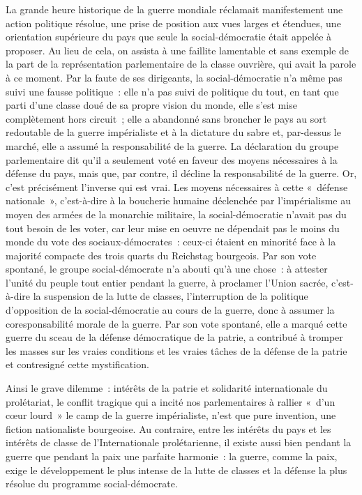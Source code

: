 \documentclass[french,twoside]{book} %
\begin{document}
La grande heure historique de la guerre mondiale réclamait manifestement une action politique résolue, une prise de position aux vues larges et étendues, une orientation supérieure du pays que seule la social-démocratie était appelée à proposer. Au lieu de cela, on assista à une faillite lamentable et sans exemple de la part de la représentation parlementaire de la classe ouvrière, qui avait la parole à ce moment. Par la faute de ses dirigeants, la social-démocratie n’a même pas suivi une fausse politique : elle n’a pas suivi de politique du tout, en tant que parti d’une classe doué de sa propre vision du monde, elle s’est mise complètement hors circuit ; elle a abandonné sans broncher le pays au sort redoutable de la guerre impérialiste et à la dictature du sabre et, par-dessus le marché, elle a assumé la responsabilité de la guerre. La déclaration du groupe parlementaire dit qu’il a seulement voté en faveur des moyens nécessaires à la défense du pays, mais que, par contre, il décline la responsabilité de la guerre. Or, c’est précisément l’inverse qui est vrai. Les moyens nécessaires à cette « défense nationale », c’est-à-dire à la boucherie humaine déclenchée par l’impérialisme au moyen des armées de la monarchie militaire, la social-démocratie n’avait pas du tout besoin de les voter, car leur mise en oeuvre ne dépendait pas le moins du monde du vote des sociaux-démocrates : ceux-ci étaient en minorité face à la majorité compacte des trois quarts du Reichstag bourgeois. Par son vote spontané, le groupe social-démocrate n’a abouti qu’à une chose : à attester l’unité du peuple tout entier pendant la guerre, à proclamer l’Union sacrée, c’est-à-dire la suspension de la lutte de classes, l’interruption de la politique d’opposition de la social-démocratie au cours de la guerre, donc à assumer la coresponsabilité morale de la guerre. Par son vote spontané, elle a marqué cette guerre du sceau de la défense démocratique de la patrie, a contribué à tromper les masses sur les vraies conditions et les vraies tâches de la défense de la patrie et contresigné cette mystification.\par
Ainsi le grave dilemme : intérêts de la patrie et solidarité internationale du prolétariat, le conflit tragique qui a incité nos parlementaires à rallier « d’un cœur lourd » le camp de la guerre impérialiste, n’est que pure invention, une fiction nationaliste bourgeoise. Au contraire, entre les intérêts du pays et les intérêts de classe de l’Internationale prolétarienne, il existe aussi bien pendant la guerre que pendant la paix une parfaite harmonie : la guerre, comme la paix, exige le développement le plus intense de la lutte de classes et la défense la plus résolue du programme social-démocrate.\par
\end{document}
